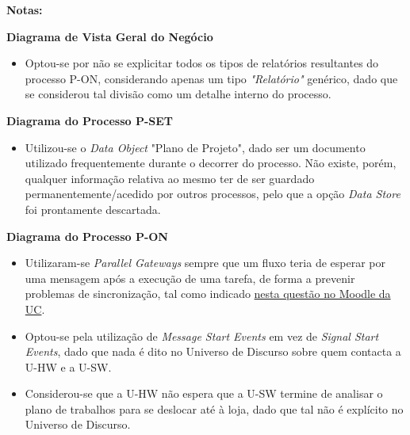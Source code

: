 \documentclass[12pt,a4paper]{article}
\begin{document}
\begin{tcolorbox}[enhanced jigsaw,colback=bg,boxrule=0pt,arc=4pt]
  \begin{large}
    \textbf{Notas:}
  \end{large}

  \begin{small}
    \textbf{Diagrama de Vista Geral do Negócio}
  \end{small}
  \begin{itemize}
    \item Optou-se por não se explicitar todos os tipos de relatórios resultantes do processo P-ON,
          considerando apenas um tipo \textit{"Relatório"} genérico, dado que se considerou tal
          divisão como um detalhe interno do processo.
  \end{itemize}

  \begin{small}
    \textbf{Diagrama do Processo P-SET}
  \end{small}
  \begin{itemize}
    \item Utilizou-se o \textit{Data Object} "Plano de Projeto", dado ser um documento
          utilizado frequentemente durante o decorrer do processo.
          Não existe, porém, qualquer informação relativa ao mesmo ter de ser guardado permanentemente/acedido
          por outros processos, pelo que a opção \textit{Data Store} foi prontamente descartada.
  \end{itemize}

  \begin{small}
    \textbf{Diagrama do Processo P-ON}
  \end{small}
  \begin{itemize}
    \item Utilizaram-se \textit{Parallel Gateways} sempre que um fluxo teria de esperar por uma
          mensagem após a execução de uma tarefa, de forma a prevenir problemas de sincronização,
          tal como indicado \href{https://moodle.dei.tecnico.ulisboa.pt/mod/forum/discuss.php?d=7213}{nesta questão no Moodle da UC}.
    \item Optou-se pela utilização de \textit{Message Start Events} em vez de \textit{Signal Start Events}, dado que nada é dito
          no Universo de Discurso sobre quem contacta a U-HW e a U-SW.
    \item Considerou-se que a U-HW não espera que a U-SW termine de analisar o plano
          de trabalhos para se deslocar até à loja, dado que tal não é explícito no Universo de Discurso.
  \end{itemize}
\end{tcolorbox}
\end{document}
